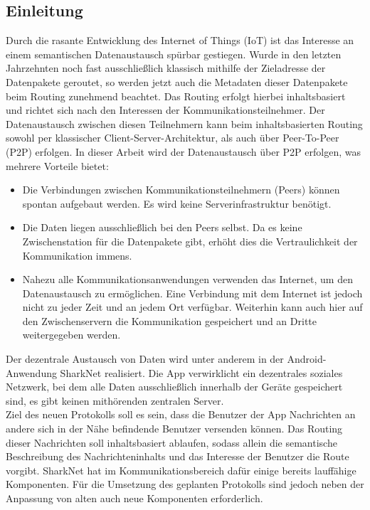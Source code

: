 


\subsection{Einleitung}
Durch die rasante Entwicklung des Internet of Things (IoT) ist das Interesse an einem semantischen Datenaustausch spürbar gestiegen. Wurde in den letzten Jahrzehnten noch fast ausschließlich klassisch mithilfe der Zieladresse der Datenpakete geroutet, so werden jetzt auch die Metadaten dieser Datenpakete beim Routing zunehmend beachtet. Das Routing erfolgt hierbei inhaltsbasiert und richtet sich nach den Interessen der Kommunikationsteilnehmer. Der Datenaustausch zwischen diesen Teilnehmern kann beim inhaltsbasierten Routing sowohl per klassischer Client-Server-Architektur, als auch über Peer-To-Peer (P2P) erfolgen. In dieser Arbeit wird der Datenaustausch über P2P erfolgen, was mehrere Vorteile bietet:
\begin{itemize}
\item Die Verbindungen zwischen Kommunikationsteilnehmern (Peers) können spontan aufgebaut werden. Es wird keine Serverinfrastruktur benötigt.
\item Die Daten liegen ausschließlich bei den Peers selbst. Da es keine Zwischenstation für die Datenpakete gibt, erhöht dies die Vertraulichkeit der Kommunikation immens. 
\item Nahezu alle Kommunikationsanwendungen verwenden das Internet, um den Datenaustausch zu ermöglichen. Eine Verbindung mit dem Internet ist jedoch nicht zu jeder Zeit und an jedem Ort verfügbar. Weiterhin kann auch hier auf den Zwischenservern die Kommunikation gespeichert und an Dritte weitergegeben werden.
\end{itemize}  
Der dezentrale Austausch von Daten wird unter anderem in der Android-Anwendung SharkNet realisiert. Die App verwirklicht ein dezentrales soziales Netzwerk, bei dem alle Daten ausschließlich innerhalb der Geräte gespeichert sind, es gibt keinen mithörenden zentralen Server. \\Ziel des neuen Protokolls soll es sein, dass die Benutzer der App Nachrichten an andere sich in der Nähe befindende Benutzer versenden können. Das Routing dieser Nachrichten soll inhaltsbasiert ablaufen, sodass allein die semantische Beschreibung des Nachrichteninhalts und das Interesse der Benutzer die Route vorgibt. SharkNet hat im Kommunikationsbereich dafür einige bereits lauffähige Komponenten. Für die Umsetzung des geplanten Protokolls sind jedoch neben der Anpassung von alten auch neue Komponenten erforderlich. 
\newpage
